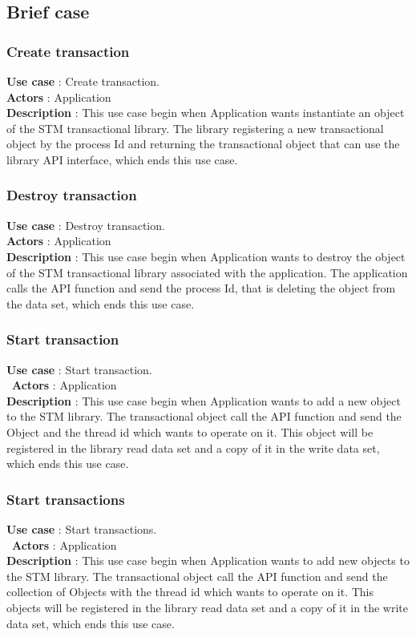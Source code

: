 \documentclass[12pt]{article}
\begin{document}
{\setlength{\parindent}{0cm}
\subsection{Brief case}
\subsubsection{Create transaction}
\textbf{Use case} : Create transaction.\\
\textbf{Actors} : Application\\
\textbf{Description} : This use case begin when Application wants instantiate an object of the STM transactional library. The library registering a new transactional object by the process Id and returning the transactional object that can use the library API interface, which ends this use case.\\
\subsubsection{Destroy transaction}
\textbf{Use case} : Destroy transaction.\\
\textbf{Actors} : Application\\
\textbf{Description} : This use case begin when Application wants to destroy the object of the STM transactional library associated with the application. The application calls the API function and send the process Id, that is deleting the object from the data set, which ends this use case.\\
\subsubsection{Start transaction}
\textbf{Use case} : Start transaction.\\\
\textbf{Actors} : Application\\
\textbf{Description} : This use case begin when Application wants to add a new object to the STM library. The transactional object call the API function and send the Object and the thread id which wants to operate on it. This object will be registered in the library read data set and a copy of it in the write data set, which ends this use case.\\  
\subsubsection{Start transactions}
\textbf{Use case} : Start transactions.\\\
\textbf{Actors} : Application\\
\textbf{Description} : This use case begin when Application wants to add new objects to the STM library. The transactional object call the API function and send the collection of Objects with the thread id  which wants to operate on it. This objects will be registered in the library read data set and a copy of it in the write data set, which ends this use case.\\ 
}
\end{document}
